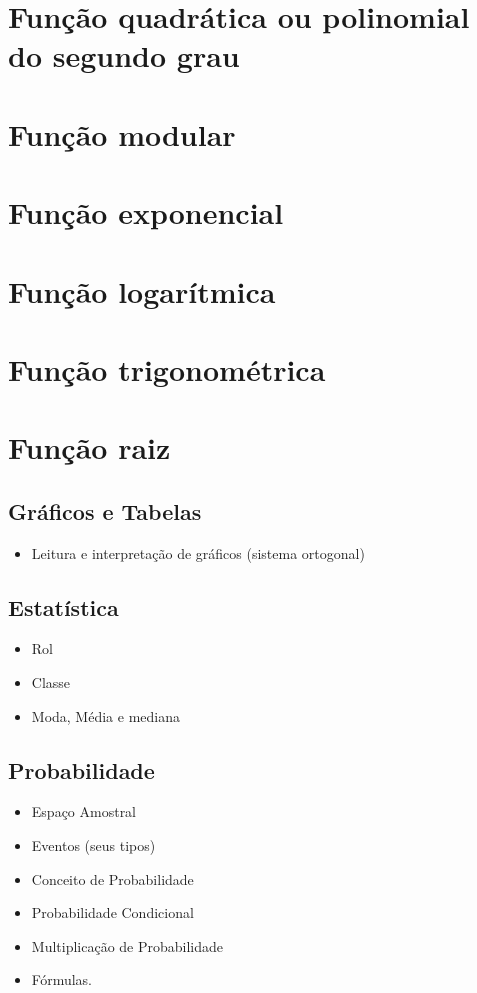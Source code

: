 \documentclass[11pt,fleqn]{book} %
\begin{document}
\chapter{Função quadrática ou polinomial do segundo grau}

\chapter{Função modular}

\chapter{Função exponencial}

\chapter{Função logarítmica}

\chapter{Função trigonométrica}

\chapter{Função raiz}


\section{Gráficos e Tabelas}%
\begin{itemize}
	\item Leitura e interpretação de gráficos (sistema ortogonal)
\end{itemize}

\section{Estatística}%
\begin{itemize}
	\item Rol
	\item Classe
	\item Moda, Média e mediana 
\end{itemize}

\section{Probabilidade}%
\begin{itemize}
	\item Espaço Amostral
	\item Eventos (seus tipos)
	\item Conceito de Probabilidade
	\item Probabilidade Condicional
	\item Multiplicação de Probabilidade
	\item Fórmulas.
\end{itemize}
\end{document}
